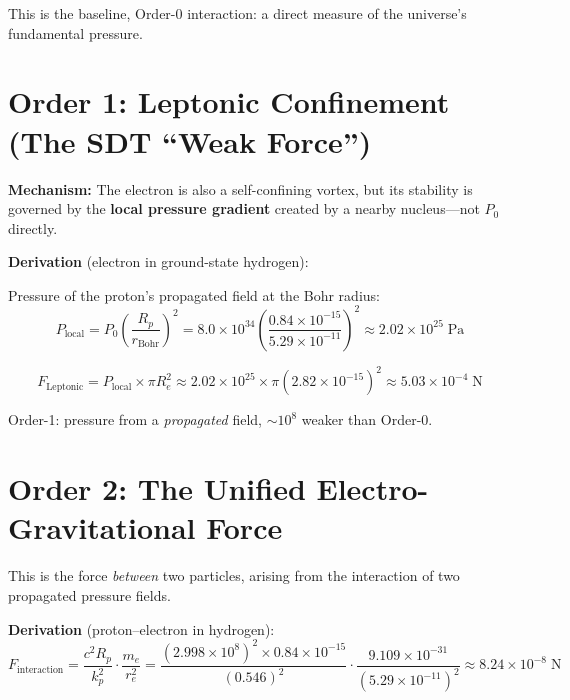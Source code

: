 This is the baseline, Order-0 interaction: a direct measure of the universe's fundamental pressure.


\section{Order 1: Leptonic Confinement (The SDT ``Weak Force'')}

\textbf{Mechanism:} The electron is also a self-confining vortex, but its stability is governed by the \textbf{local pressure gradient} created by a nearby nucleus---not $P_0$ directly.

\textbf{Derivation} (electron in ground-state hydrogen):

Pressure of the proton's propagated field at the Bohr radius:
\begin{equation}
  P_{\text{local}} = P_0 \left(\frac{R_p}{r_{\text{Bohr}}}\right)^2
    = 8.0 \times 10^{34} \left(\frac{0.84 \times 10^{-15}}{5.29 \times 10^{-11}}\right)^2
    \approx 2.02 \times 10^{25}\;\text{Pa}
\end{equation}

\begin{equation}\label{eq:F-leptonic}
  F_{\text{Leptonic}} = P_{\text{local}} \times \pi R_e^2
    \approx 2.02 \times 10^{25} \times \pi(2.82 \times 10^{-15})^2
    \approx 5.03 \times 10^{-4}\;\text{N}
\end{equation}

Order-1: pressure from a \emph{propagated} field, $\sim 10^8$ weaker than Order-0.


\section{Order 2: The Unified Electro-Gravitational Force}

This is the force \emph{between} two particles, arising from the interaction of two propagated pressure fields.

\textbf{Derivation} (proton--electron in hydrogen):
\begin{equation}\label{eq:F-EM}
  F_{\text{interaction}} = \frac{c^2 R_p}{k_p^2} \cdot \frac{m_e}{r_e^2}
    = \frac{(2.998 \times 10^8)^2 \times 0.84 \times 10^{-15}}{(0.546)^2}
      \cdot \frac{9.109 \times 10^{-31}}{(5.29 \times 10^{-11})^2}
    \approx 8.24 \times 10^{-8}\;\text{N}
\end{equation}

